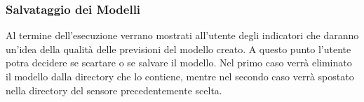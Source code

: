 \documentclass[a4paper,10pt]{article}
\begin{document}
\subsubsection{Salvataggio dei Modelli}
Al termine dell'esecuzione verrano mostrati all'utente degli indicatori che daranno un'idea della qualità delle previsioni del modello creato.
A questo punto l'utente potra decidere se scartare o se salvare il modello. Nel primo caso verrà eliminato il modello dalla directory che lo contiene, mentre nel 
secondo caso verrà spostato nella directory del sensore precedentemente scelta. 
\end{document}
